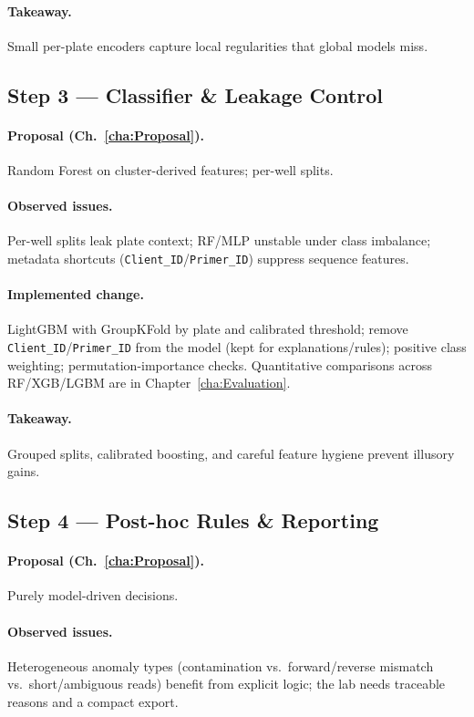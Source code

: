 \paragraph{Takeaway.} Small per-plate encoders capture local regularities that global models miss.

\subsection*{Step 3 — Classifier \& Leakage Control}
\paragraph{Proposal (Ch.~\ref{cha:Proposal}).}
Random Forest on cluster-derived features; per-well splits.

\paragraph{Observed issues.}
Per-well splits leak plate context; RF/MLP unstable under class imbalance; metadata shortcuts (\texttt{Client\_ID}/\texttt{Primer\_ID}) suppress sequence features.

\paragraph{Implemented change.}
LightGBM with GroupKFold by plate and calibrated threshold; remove \texttt{Client\_ID}/\texttt{Primer\_ID} from the model (kept for explanations/rules); positive class weighting; permutation-importance checks. Quantitative comparisons across RF/XGB/LGBM are in Chapter~\ref{cha:Evaluation}.

\paragraph{Takeaway.} Grouped splits, calibrated boosting, and careful feature hygiene prevent illusory gains.

\subsection*{Step 4 — Post-hoc Rules \& Reporting}
\paragraph{Proposal (Ch.~\ref{cha:Proposal}).}
Purely model-driven decisions.

\paragraph{Observed issues.}
Heterogeneous anomaly types (contamination vs.\ forward/reverse mismatch vs.\ short/ambiguous reads) benefit from explicit logic; the lab needs traceable reasons and a compact export.

